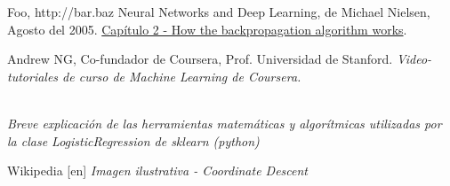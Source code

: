 \documentclass[a4paper]{article}
\begin{document}


\pagestyle{fancy}
\lhead{\slshape \leftmark}
\chead{\scalebox{0.1}{asasasa}}
\renewcommand{\headrulewidth}{0.4pt}
\renewcommand{\footrulewidth}{0.4pt}

  \tableofcontents
  \clearpage

  


  

  





\clearpage
\begin{thebibliography}{3}

  Foo, http://bar.baz
 Neural Networks and Deep Learning, de Michael Nielsen, Agosto del 2005. \href{Capítulo 2}{Capítulo 2 - How the backpropagation algorithm works}.
  
	Andrew NG, Co-fundador de Coursera, Prof. Universidad de Stanford. \textit{Video-tutoriales de curso de Machine Learning de Coursera.}
	
	\href{http://scikit-learn.org/stable/modules/linear\char`_model.html\#logistic-regression}  \\ \textit{Breve explicación de las herramientas matemáticas y algorítmicas utilizadas por la clase LogisticRegression de sklearn (python)}
	
	Wikipedia [en] \textit{Imagen ilustrativa - Coordinate Descent}
\end{thebibliography}
\end{document}
